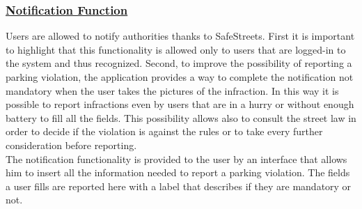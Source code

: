 	\subsubsection[Notification Function]{\hyperlink{toc}{Notification Function}}
		\label{sec:notificationFunction}
		Users are allowed to notify authorities thanks to SafeStreets. First it is important to highlight that this functionality is allowed only to users that are logged-in to the system and thus recognized. Second, to improve the possibility of reporting a parking violation, the application provides a way to complete the notification not mandatory when the user takes the pictures of the infraction. In this way it is possible to report infractions even by users that are in a hurry or without enough battery to fill all the fields. This possibility allows also to consult the street law in order to decide if the violation is against the rules or to take every further consideration before reporting.\\
		
		The notification functionality is provided to the user by an interface that allows him to insert all the information needed to report a parking violation. The fields a user fills are reported here with a label that describes if they are mandatory or not.
		
